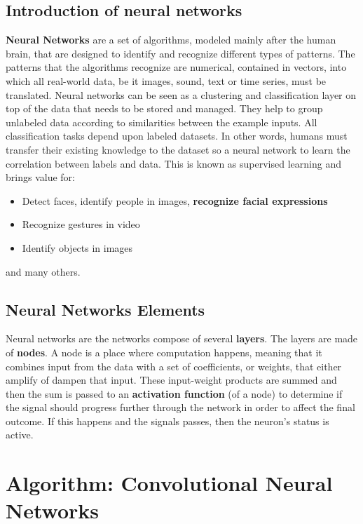 \documentclass[runningheads,a4paper,11pt]{report}
\begin{document}
\section{Introduction of neural networks}
\label{section:introduction_neural_networks}
\textbf{Neural Networks} are a set of algorithms, modeled mainly after the human brain, that are designed to identify and recognize different types of patterns. The patterns that the algorithms recognize are numerical, contained in vectors, into which all real-world data, be it images, sound, text or time series, must be translated.
Neural networks can be seen as a clustering and classification layer on top of the data that needs to be stored and managed. They help to group unlabeled data according to similarities between the example inputs. 
All classification tasks depend upon labeled datasets. In other words, humans must transfer their existing knowledge to the dataset so a neural network to learn the correlation between labels and data. This is known as supervised learning and brings value for:
\begin{itemize}
	\item Detect faces, identify people in images, \textbf{recognize facial expressions}
	\item Recognize gestures in video
	\item Identify objects in images
\end{itemize} and many others.\cite{skymindneural}
\section{Neural Networks Elements}
\label{section:neural_networks_elements}
Neural networks are the networks compose of several \textbf{layers}. 
The layers are made of \textbf{nodes}. A node is a place where computation happens, meaning that it combines input from the data with a set of coefficients, or weights, that either amplify of dampen that input. These input-weight products are summed and then the sum is passed to an \textbf{activation function} (of a node) to determine if the signal should progress further through the network in order to affect the final outcome. If this happens and the signals passes, then the neuron's status is active.\cite{skymindneural,machinelearning}
\chapter{Algorithm: Convolutional Neural Networks}
\label{chapter:cnn}
\end{document}
